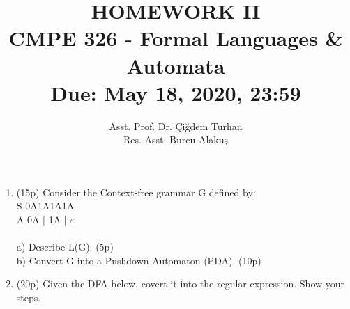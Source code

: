 \documentclass[11pt]{article}
\begin{document}
\author{ Asst. Prof. Dr. Çiğdem Turhan\\Res. Asst. Burcu Alakuş}
\title{HOMEWORK II\\CMPE 326 - Formal Languages \& Automata\\  Due: May 18, 2020, 23:59}
\date{\vspace{-5ex}}
\maketitle

\medskip

\begin{enumerate}

\item (15p) Consider the Context-free grammar G defined by:\\
\hspace*{10mm} S \rightarrow 0A1A1A1A \\
\hspace*{10mm} A \rightarrow 0A \: | \: 1A \: | \: $ \varepsilon $ \\\\
\hspace*{3mm} a) Describe L(G). (5p)\\
\hspace*{3mm} b) Convert G into a Pushdown Automaton (PDA). (10p)\\

\item
(20p) Given the DFA below, covert it into the regular expression. Show your steps.\\
\end{enumerate}
\end{document}
